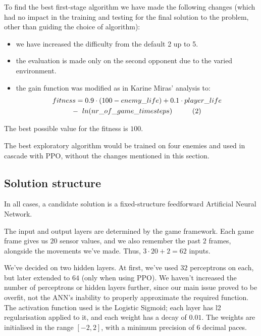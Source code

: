 \documentclass[conference]{IEEEtran}
\begin{document}
    To find the best first-stage algorithm we have made the following changes (which had no impact in the training and testing for the final solution to the problem, other than guiding the choice of algorithm):
    \begin{itemize}
        \item we have increased the difficulty from the default 2 up to 5.
        \item the evaluation is made only on the second opponent due to the varied environment.
        \item the gain function was modified as in Karine Miras' analysis\cite{evoman_blog} to:
        \begin{gather*}
          fitness = 
            0.9 \cdot (100 - enemy\_life) + 0.1 \cdot player\_life\\
            -\hspace{0.2cm} ln(nr\_of\_game\_timesteps) \hspace{1cm} (2)
        \end{gather*}
    \end{itemize}

    The best possible value for the fitness is $100$.

    The best exploratory algorithm would be trained on four enemies and
    used in cascade with PPO, without the changes mentioned in this section.

    \subsection{Solution structure}
    In all cases, a candidate solution is a fixed-structure feedforward Artificial Neural Network.

    The input and output layers are determined by the game framework. Each game frame gives us $20$ sensor values, and we also remember the past $2$ frames, alongside the movements we've made. Thus, $3 \cdot 20 + 2 = 62$ inputs.

    We've decided on two hidden layers. At first, we've used $32$ perceptrons on each, but later extended to $64$ (only when using PPO). We haven't increased the number of perceptrons or hidden layers further, since our main issue proved to be overfit, not the ANN's inability to properly approximate the required function\cite{cybenko}.
    The activation function used is the Logistic Sigmoid; each layer has l2 regularisation applied to it, and each weight has a decay of $0.01$.
    The weights are initialised in the range $[-2, 2]$, with a minimum precision of $6$ decimal paces.
    
\end{document}
